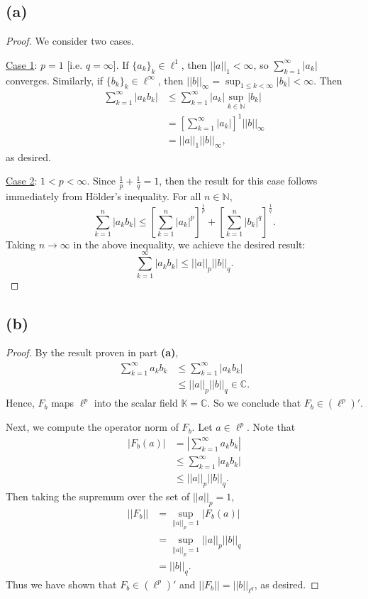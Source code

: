 \documentclass{article}
\begin{document}
\subsection*{(a)}
\begin{proof}
	We consider two cases. 
	
	\underline{Case 1}: $p=1$ [i.e. $q=\infty$]. If $\{a_k\}_k\in\ell^1$, then $||a||_1 < \infty$, so $\sum_{k=1}^{\infty} |a_k|$ converges. Similarly, if $\{b_k\}_k\in\ell^{\infty}$, then $||b||_{\infty} = \sup_{1\leq k <  \infty}|b_k|<\infty$. Then
	\begin{align}
		\sum_{k=1}^{\infty}|a_k b_k| &\leq \sum_{k=1}^{\infty}|a_k|\sup_{k\in\mathbb{N}}|b_k| \\
		&= \left[\sum_{k=1}^{\infty}|a_k|\right]^1 ||b||_{\infty} \\
		&= ||a||_1||b||_{\infty},
	\end{align}
	as desired.
	
	\underline{Case 2}: $1<p<\infty$. Since $\frac{1}{p} + \frac{1}{q}=1$, then the result for this case follows immediately from Hölder's inequality. For all $n\in\mathbb{N}$, 
	\begin{equation}
		\sum_{k=1}^n |a_k b_k| \leq \left[\sum_{k=1}^n |a_k|^p\right]^\frac{1}{p} + \left[\sum_{k=1}^n |b_k|^q\right]^\frac{1}{q}.
	\end{equation}
	Taking $n\to\infty$ in the above inequality, we achieve the desired result:
	\begin{equation}
		\sum_{k=1}^{\infty} |a_k b_k| \leq ||a||_p||b||_q. 
	\end{equation}
\end{proof}
\subsection*{(b)}
\begin{proof}
	By the result proven in part \textbf{(a)},
	\begin{align}
		\sum_{k=1}^{\infty} a_k b_k &\leq \sum_{k=1}^{\infty} |a_k b_k| \\
		&\leq ||a||_p||b||_q \in \mathbb{C}.
	\end{align}
	Hence, $F_b$  maps $\ell^p$ into the scalar field $\mathbb{K} = \mathbb{C}$. So we conclude that $F_b\in \left(\ell^p\right)'$. 
	
	Next, we compute the operator norm of $F_b$. Let $a\in\ell^p$. Note that
	\begin{align}
		|F_b(a)|&=\left|\sum_{k=1}^{\infty} a_k b_k \right|\\
		&\leq \sum_{k=1}^{\infty} |a_k b_k| \\
		&\leq ||a||_p ||b||_q.
	\end{align}
	Then taking the supremum over the set of $||a||_p=1$,
	\begin{align}
		||F_b||&=\sup_{||a||_p=1} |F_b(a)| \\
		&= \sup_{||a||_p=1} ||a||_p ||b||_q \\
		&= ||b||_q. 
	\end{align}
	Thus we have shown that $F_b \in \left(\ell^p\right)'$ and $||F_b||=||b||_{\ell^q}$, as desired.
\end{proof}
\end{document}
